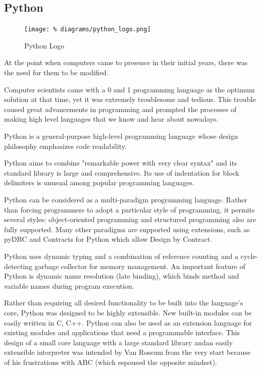 \subsection{Python}
\label{s_python}

\begin{figure}[H]
  \centering
  \texttt{[image: \%
    diagrams/python\_logo.png]}
  \caption{Python Logo}
\end{figure}

At the point when computers came to presence in their
initial years, there was the need for them to be modified.

Computer scientists came with a 0 and 1 programming
language as the optimum solution at that time, yet it was
extremely troublesome and tedious. This trouble caused
great advancements in programming and prompted the
processes of making high level languages that we know and
hear about nowadays.

Python is a general-purpose high-level programming
language\cite{amjad1} whose design philosophy
emphasizes code readability.\cite{amjad2}

Python aims to combine "remarkable power with very clear
syntax"\cite{amjad3} and its standard library is large and
comprehensive. Its use of indentation for block delimiters
is unusual among popular programming languages.

Python can be considered as a multi-paradigm programming
language. Rather than forcing programmers to adopt a
particular style of programming, it permits several styles:
object-oriented programming and structured programming also
are fully supported. Many other paradigms are supported
using extensions, such as pyDBC\cite{amjad4} and Contracts
for Python\cite{amjad5} which allow Design by Contract.

Python uses dynamic typing and a combination of reference
counting and a cycle-detecting garbage collector for memory
management. An important feature of Python is dynamic name
resolution (late binding), which binds method and variable
names during program execution.

Rather than requiring all desired functionality to be built
into the language's core, Python was designed to be highly
extensible. New built-in modules can be easily written in
C, C++. Python can also be used as an extension language
for existing modules and applications that need a
programmable interface. This design of a small core
language with a large standard library andan easily
extensible interpreter was intended by Van Rossum from the
very start because of his frustrations with ABC (which
espoused the opposite mindset).\cite{amjad6}

